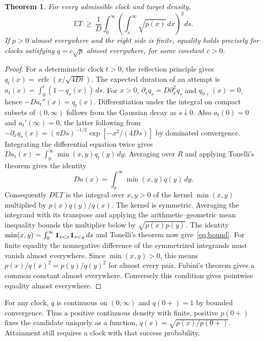 \documentclass[11pt]{article}
\newtheorem{theorem}{Theorem}
\newcommand{\E}{\mathbb{E}}
\newcommand{\erfc}{\operatorname{erfc}}
\begin{document}
\begin{theorem}\label{thm:bound}
For every admissible clock and target density,
\begin{equation}\label{eq:bound}
 \E T\ \ge\ \frac{1}{D}\int_0^\infty
 \left(\int_s^\infty \sqrt{p(x)}\,dx\right)^2 ds .
\end{equation}
If $p>0$ almost everywhere and the right side is finite, equality holds
precisely for clocks satisfying $q=c\sqrt p$ almost everywhere, for some
constant $c>0$.
\end{theorem}
\begin{proof}
For a deterministic clock $t>0$, the reflection principle gives
$q_t(x)=\erfc(x/\sqrt{4Dt})$. The expected duration of an attempt is
$a_t(x)=\int_0^t(1-q_s(x))\,ds$. For $x>0$,
$\partial_s q_s=D\partial_x^2 q_s$ and $q_{0+}(x)=0$, hence
$-Da_t''(x)=q_t(x)$. Differentiation under the integral on compact
subsets of $(0,\infty)$ follows from the Gaussian decay as $s\downarrow0$.
Also $a_t(0)=0$ and $a_t'(\infty)=0$, the latter following from
$-\partial_x q_s(x)=(\pi Ds)^{-1/2}\exp[-x^2/(4Ds)]$ by dominated
convergence. Integrating the differential equation twice gives
$Da_t(x)=\int_0^\infty \min(x,y)q_t(y)\,dy$.
Averaging over $R$ and applying Tonelli's theorem gives the identity
\begin{equation}\label{eq:kernel}
 Da(x)=\int_0^\infty \min(x,y)q(y)\,dy .
\end{equation}
Consequently $D\E T$ is the integral over $x,y>0$ of the kernel
$\min(x,y)$ multiplied by $p(x)q(y)/q(x)$. The kernel is symmetric.
Averaging the integrand with its transpose and applying the
arithmetic--geometric mean inequality bounds the multiplier below by
$\sqrt{p(x)p(y)}$. The identity
$\min(x,y)=\int_0^\infty {\bf1}_{s<x}{\bf1}_{s<y}\,ds$ and Tonelli's
theorem now give~\eqref{eq:bound}.
For finite equality the nonnegative difference of the symmetrized
integrands must vanish almost everywhere. Since $\min(x,y)>0$, this means
$p(x)/q(x)^2=p(y)/q(y)^2$ for almost every pair. Fubini's theorem gives
a common constant almost everywhere. Conversely this condition gives
pointwise equality almost everywhere.
\end{proof}
For any clock, $q$ is continuous on $(0,\infty)$ and $q(0+)=1$ by
bounded convergence. Thus a positive continuous density with finite,
positive $p(0+)$ fixes the candidate uniquely as a function,
$q(x)=\sqrt{p(x)/p(0+)}$. Attainment still requires a clock with that
success probability.
\end{document}
